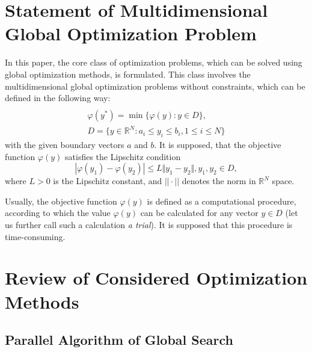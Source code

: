 \documentclass{svproc}
\begin{document}
\section{Statement of Multidimensional Global Optimization Problem}
In this paper, the core class of optimization problems, which can be solved using
global optimization methods, is formulated. This class involves the multidimensional global
optimization problems without constraints, which can be defined in the following way:
\begin{equation}
\label{eq:task}
\begin{array}{cr}\\
  \varphi(y^*)=\min\{\varphi(y):y\in D\}, \\
  D=\{y\in \mathbb{R}^N:a_i\leq y_i\leq{b_i}, 1\leq{i}\leq{N}\}
\end{array}
\end{equation}
with the given boundary vectors  $a$ and  $b$. It is supposed, that the objective function
\(\varphi(y)\) satisfies the Lipschitz condition
\begin{equation}
\label{eq:lip}
|\varphi(y_1)-\varphi(y_2)|\leq L\Vert y_1-y_2\Vert,y_1,y_2\in D,
\end{equation}
where \(L>0\) is the Lipschitz constant, and \(||\cdot||\) denotes the norm in \(\mathbb{R}^N\)
space.
\par
Usually, the objective function \(\varphi(y)\) is defined as a computational procedure,
according to which the value \(\varphi(y)\) can be calculated for any vector \(y\in D\)
(let us further call such a calculation \textit{a trial}). It is supposed that this procedure
is time-consuming.

\section{Review of Considered Optimization Methods}

\subsection{Parallel Algorithm of Global Search}
\end{document}
